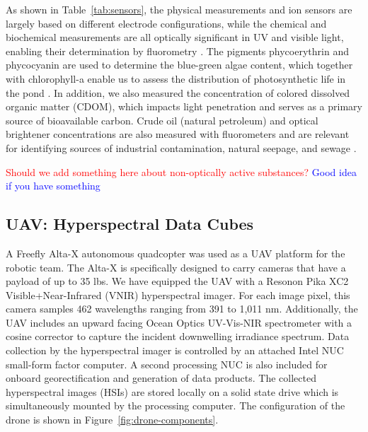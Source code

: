 \documentclass[remotesensing,article,submit,pdftex,moreauthors]{Definitions/mdpi}
\begin{document}
As shown in Table~\ref{tab:sensors}, the physical measurements and ion sensors are largely based on different electrode configurations, while the chemical and biochemical measurements are all optically significant in UV and visible light, enabling their determination by fluorometry \cite{de2007ion,trees2002fluorometric,tillman2017evaluation}. The pigments phycoerythrin and phycocyanin are used to determine the blue-green algae content, which together with chlorophyll-a enable us to assess the distribution of photosynthetic life in the pond \cite{Brient2008APP, boyer2009phytoplankton}. In addition, we also measured the concentration of colored dissolved organic matter (CDOM), which impacts light penetration and serves as a primary source of bioavailable carbon. Crude oil (natural petroleum) and optical brightener concentrations are also measured with fluorometers and are relevant for identifying sources of industrial contamination, natural seepage, and sewage \cite{brown2003review,cao2009evaluation}.

\textcolor{red}{Should we add something here about non-optically active substances?}
\textcolor{blue}{Good idea if you have something}

\subsection{UAV: Hyperspectral Data Cubes}

A Freefly Alta-X autonomous quadcopter was used as a UAV platform for the robotic team. The Alta-X is specifically designed to carry cameras that have a payload of up to 35 lbs. We have equipped the UAV with a Resonon Pika XC2 Visible+Near-Infrared (VNIR) hyperspectral imager. For each image pixel, this camera samples 462 wavelengths ranging from 391 to 1,011 nm.  Additionally, the UAV includes an upward facing Ocean Optics UV-Vis-NIR spectrometer with a cosine corrector to capture the incident downwelling irradiance spectrum. Data collection by the hyperspectral imager is controlled by an attached Intel NUC small-form factor computer. A second processing NUC is also included for onboard georectification and generation of data products. The collected hyperspectral images (HSIs) are stored locally on a solid state drive which is simultaneously mounted by the processing computer. The configuration of the drone is shown in Figure~\ref{fig:drone-components}.
\end{document}
